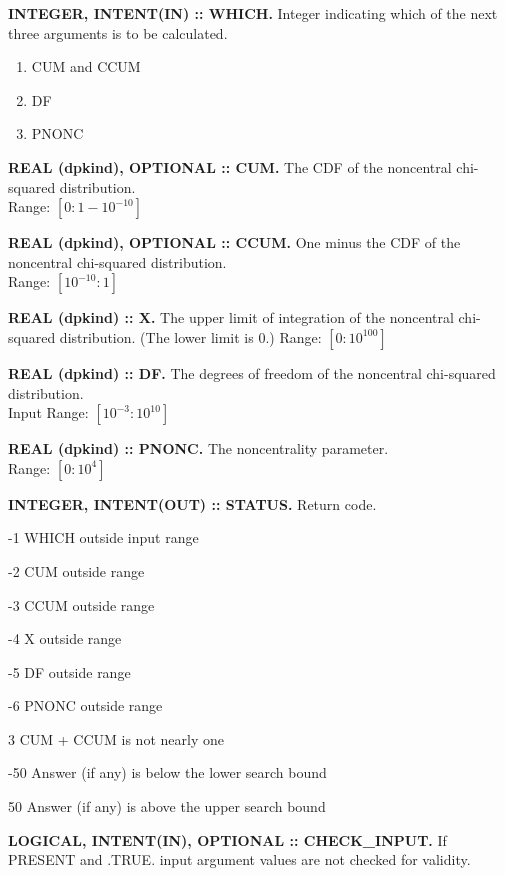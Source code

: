 \documentclass[12pt,dvips]{article}
\newcommand{\range}[2]{\hfill Range: \ensuremath{\left[ #1:#2
\right]}\\}
\newcommand{\inrange}[2]{\hfill Input Range: \ensuremath{\left[ #1:#2
\right]}\\}
\newcommand{\sdf}{10^{-3}}
\newcommand{\bdf}{10^{10}}
\newcommand{\sprob}{10^{-10}}
\newcommand{\bprob}{1-\sprob}
\newcommand{\immense}{10^{100}}
\newcommand{\spnonc}{0}
\newcommand{\bpnonc}{10^4}
\newcommand{\myitem}[1]{\item{\bf \color{Violet} #1 \normalcolor}}
\begin{document}
\begin{description}

\myitem{INTEGER, INTENT(IN)  :: WHICH.} Integer indicating  which of the
next three arguments is to be calculated.\\
\begin{enumerate}
\item CUM and CCUM
\item DF
\item PNONC
\end{enumerate}

\myitem{REAL (dpkind), OPTIONAL :: CUM.} The CDF of the noncentral
chi-squared  distribution.\\
\range{0}{\bprob}

\myitem{REAL (dpkind), OPTIONAL :: CCUM.} One minus the CDF of the
noncentral chi-squared distribution.\\
\range{\sprob}{1}

\myitem{REAL (dpkind) :: X.} The upper limit of integration of the
noncentral
chi-squared distribution.  (The lower limit is 0.)
\range{0}{\immense}

\myitem{REAL (dpkind) :: DF.}  The  degrees of
freedom of the noncentral chi-squared distribution.\\
\inrange{\sdf}{\bdf}

\myitem{REAL (dpkind) :: PNONC.}  The noncentrality parameter.\\
\range{\spnonc}{\bpnonc}

\myitem{INTEGER, INTENT(OUT) :: STATUS.} Return code.
\begin{description}
\item{-1}  WHICH outside input range
\item{-2}  CUM outside range
\item{-3}  CCUM outside range
\item{-4}  X outside range
\item{-5}  DF outside range
\item{-6}  PNONC outside range
\item{3} CUM + CCUM is not nearly one
\item{-50} Answer (if any) is below the lower search bound
\item{50} Answer (if any) is above the upper search bound
\end{description}

\myitem{LOGICAL, INTENT(IN), OPTIONAL :: CHECK\_INPUT.}  If PRESENT
and .TRUE. input argument values are not checked for validity.

\end{description}
\end{document}
